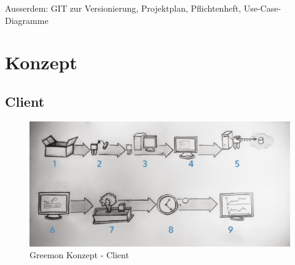\documentclass[pointlessnumbers]{scrartcl}
\begin{document}
 

Ausserdem: GIT zur Versionierung, Projektplan, Pflichtenheft, Use-Case-Diagramme

\newpage
\section{Konzept}
\subsection{Client}

\begin{figure}[htbp] 
  \centering
     \includegraphics[width=1\textwidth]{Skizze_Quickstartguide_numeriert.jpg}
  \caption{Greemon Konzept - Client}
  \label{fig:Bild1}
\end{figure}
\end{document}
